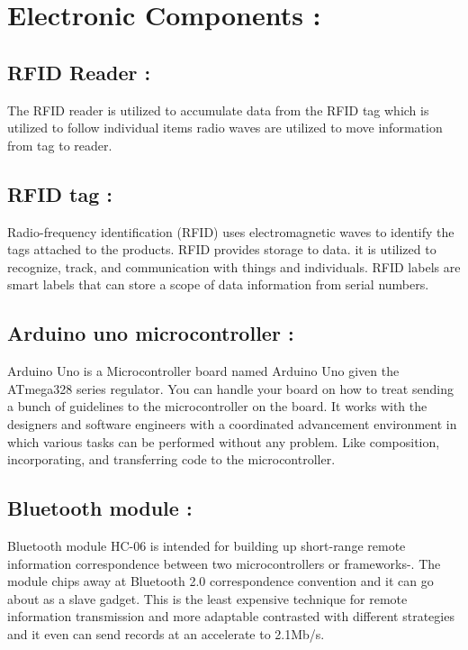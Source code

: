 \documentclass[conference]{IEEEtran}
\begin{document}
\section{Electronic Components :}

\subsection{RFID Reader :}
The RFID reader is utilized to accumulate data from the RFID tag which is utilized to follow individual items radio waves are utilized to move information from tag to reader\cite{b1}.
   

\subsection{RFID tag :}
Radio-frequency identification (RFID) uses electromagnetic waves to identify the tags attached to the products. RFID provides storage to data. it is utilized to recognize, track, and communication with things and individuals. RFID labels are smart labels that can store a scope of data information from serial numbers\cite{b1}.


\subsection{Arduino uno microcontroller :}

Arduino Uno is a Microcontroller board named Arduino Uno given the ATmega328 series regulator. You can handle your board on how to treat sending a bunch of guidelines to the microcontroller on the board\cite{b7}. It works with the designers and software engineers with a coordinated advancement environment in which various tasks can be performed without any problem. Like composition, incorporating, and transferring code to the microcontroller\cite{b8}.

\subsection{Bluetooth module :}
Bluetooth module HC-06 is intended for building up short-range remote information correspondence between two microcontrollers or frameworks\cite{b1}-\cite{b2}. The module chips away at Bluetooth 2.0 correspondence convention and it can go about as a slave gadget. This is the least expensive technique for remote information transmission and more adaptable contrasted with different strategies and it even can send records at an accelerate to 2.1Mb/s.
\end{document}
